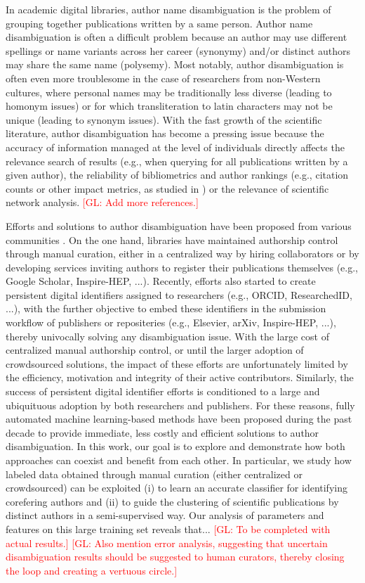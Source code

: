 \documentclass{article}
\newcommand{\glnote}[1]{\textcolor{red}{[GL: #1]}}
\begin{document}
In academic digital libraries, author name disambiguation is the problem of
grouping together publications written by a same person.  Author name
disambiguation is often a difficult problem because an author may use different
spellings or name variants across her career (synonymy) and/or distinct authors may
share the same name (polysemy). Most notably, author disambiguation is often even more
troublesome in the case of researchers from non-Western cultures, where
personal names may be traditionally less diverse (leading to homonym issues) or
for which transliteration to latin characters may not be unique (leading to
synonym issues). With the fast growth of the scientific literature, author
disambiguation has become a pressing issue because the accuracy of information
managed at the level of individuals directly affects the relevance search of
results (e.g., when querying for all publications written by a given author),
the reliability of bibliometrics and author rankings (e.g., citation counts or other impact
metrics, as studied in \citep{strotmann2012author}) or the relevance of scientific network analysis.
\glnote{Add more references.}

Efforts and solutions to author disambiguation have been proposed from various
communities \citep{liu2014author}. On the one hand, libraries have maintained
authorship control through manual curation, either in a centralized way by
hiring collaborators or by developing services inviting authors to register
their publications themselves (e.g., Google Scholar, Inspire-HEP, ...).
Recently, efforts also started to create persistent digital identifiers
assigned to researchers (e.g., ORCID, ResearchedID, ...), with the further
objective to embed these identifiers in the submission workflow of publishers
or repositeries (e.g., Elsevier, arXiv, Inspire-HEP, ...), thereby univocally
solving any disambiguation issue. With the large cost of centralized manual
authorship control, or until the larger adoption of crowdsourced solutions, the
impact of these efforts are unfortunately limited by the efficiency, motivation
and integrity of their active contributors. Similarly, the success of
persistent digital identifier efforts is conditioned to a large and ubiquituous
adoption by both researchers and publishers. For these reasons, fully automated
machine learning-based methods have been proposed during the past decade to
provide immediate, less costly and efficient solutions to author
disambiguation. In this work, our goal is to explore and demonstrate how both
approaches can coexist and benefit from each other.  In particular, we study
how labeled data obtained through manual curation (either centralized or
crowdsourced) can be exploited (i) to learn an accurate classifier for
identifying corefering authors and (ii) to guide the clustering of scientific
publications by distinct authors in a semi-supervised way. Our analysis of parameters
and features on this large training set reveals that... \glnote{To be completed
with actual results.} \glnote{Also mention error analysis, suggesting that
uncertain disambiguation results should be suggested to human curators, thereby
closing the loop and creating a vertuous circle.}
\end{document}
